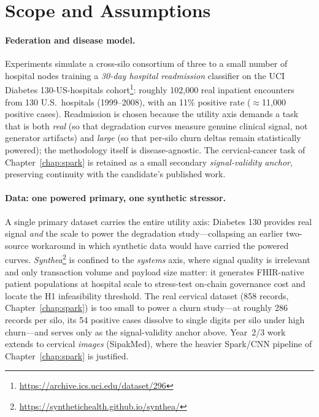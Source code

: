 \documentclass[12pt]{report}
\begin{document}
\section{Scope and Assumptions}

\paragraph{Federation and disease model.} Experiments simulate a cross-silo
consortium of three to a small number of hospital nodes training a
\emph{30-day hospital readmission} classifier on the UCI Diabetes
130-US-hospitals cohort\footnote{\url{https://archive.ics.uci.edu/dataset/296}}:
roughly 102{,}000 real inpatient encounters from 130 U.S.\ hospitals
(1999--2008), with an 11\% positive rate ($\approx$11{,}000 positive cases).
Readmission is chosen because the utility axis demands a task that is both
\emph{real} (so that degradation curves measure genuine clinical signal, not
generator artifacts) and \emph{large} (so that per-silo churn deltas remain
statistically powered); the methodology itself is disease-agnostic. The
cervical-cancer task of Chapter~\ref{chap:spark} is retained as a small
secondary \emph{signal-validity anchor}, preserving continuity with the
candidate's published work.

\paragraph{Data: one powered primary, one synthetic stressor.} A single primary
dataset carries the entire utility axis: Diabetes 130 provides real signal
\emph{and} the scale to power the degradation study---collapsing an earlier
two-source workaround in which synthetic data would have carried the powered
curves. \emph{Synthea}\footnote{\url{https://synthetichealth.github.io/synthea/}}
is confined to the \emph{systems} axis, where signal quality is irrelevant and
only transaction volume and payload size matter: it generates FHIR-native
patient populations at hospital scale to stress-test on-chain governance cost
and locate the H1 infeasibility threshold. The real cervical dataset (858
records, Chapter~\ref{chap:spark}) is too small to power a churn study---at
roughly 286 records per silo, its 54 positive cases dissolve to single digits
per silo under high churn---and serves only as the signal-validity anchor above.
Year~2/3 work extends to cervical \emph{images} (SipakMed), where the heavier
Spark/CNN pipeline of Chapter~\ref{chap:spark} is justified.
\end{document}
